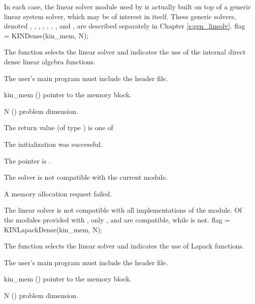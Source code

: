 In each case, the linear solver module used by {\kinsol} is actually
built on top of a generic linear system solver, which may be of
interest in itself. These generic solvers, denoted {\dense}, {\band},
{\klu}, {\superlumt}, {\spgmr}, {\spfgmr}, {\spbcg}, and {\sptfqmr},
are described separately in Chapter \ref{s:gen_linsolv}.
{
  flag = KINDense(kin\_mem, N);
}
{
  The function  selects the {\kindense} linear solver and indicates
  the use of the internal direct dense linear algebra functions. 

  The user's main program must include the  header file.
}
{
  \begin{args}
  \item[kin\_mem] ()
    pointer to the {\kinsol} memory block.
  \item[N] ()
    problem dimension.
  \end{args}
}
{
  The return value  (of type ) is one of
  \begin{args}
  \item[\Id{KINDLS\_SUCCESS}] 
    The {\kindense} initialization was successful.
  \item[\Id{KINDLS\_MEM\_NULL}]
    The  pointer is .
  \item[\Id{KINDLS\_ILL\_INPUT}]
    The {\kindense} solver is not compatible with the current {\nvector} module.
  \item[\Id{KINDLS\_MEM\_FAIL}]
    A memory allocation request failed.
  \end{args}
}
{
  The {\kindense} linear solver is not compatible with all
  implementations of the {\nvector} module.  Of the {\nvector} modules
  provided with {\sundials}, only {\nvecs}, {\nvecopenmp} and
  {\nvecpthreads} are compatible, while {\nvecp} is not.
}
{
  flag = KINLapackDense(kin\_mem, N);
}
{
  The function  selects the {\kindense} linear solver and 
  indicates the use of Lapack functions. 

  The user's main program must include the  header file.
}
{
  \begin{args}
  \item[kin\_mem] ()
    pointer to the {\kinsol} memory block.
  \item[N] ()
    problem dimension.
  \end{args}
}
